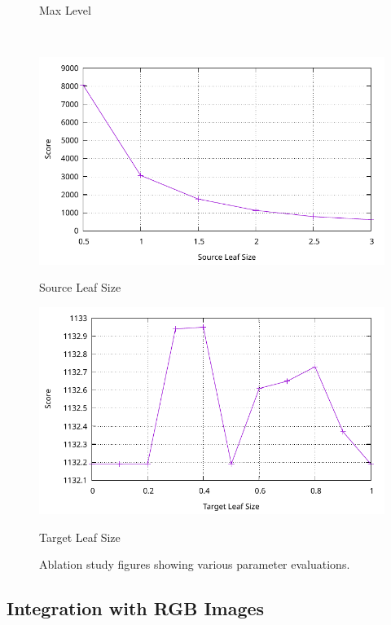 \begin{figure}[t]
\begin{minipage}{0.32\textwidth}
        \caption{Max Level}
    \end{minipage}
    \\
    \vspace{1em}
    \begin{minipage}{0.32\textwidth}
        \centering
        \includegraphics[width=\textwidth]{../02-global-localization/plots/src_leaf_size.pdf}
        \caption{Source Leaf Size}
    \end{minipage}
    \hfill
    \begin{minipage}{0.32\textwidth}
        \centering
        \includegraphics[width=\textwidth]{../02-global-localization/plots/tar_leaf_size.pdf}
        \caption{Target Leaf Size}
    \end{minipage}

    \caption{Ablation study figures showing various parameter evaluations.}
    \label{fig:ablation_study}
\end{figure}

\subsection{Integration with RGB Images}

